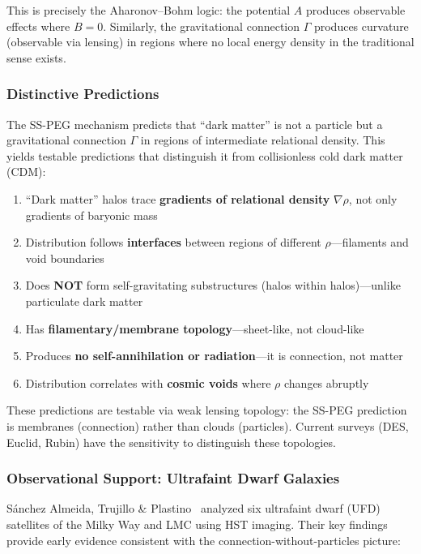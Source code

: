 This is precisely the Aharonov--Bohm logic: the potential $A$ produces observable effects where $B = 0$. Similarly, the gravitational connection $\Gamma$ produces curvature (observable via lensing) in regions where no local energy density in the traditional sense exists.

\subsubsection{Distinctive Predictions}

The SS-PEG mechanism predicts that ``dark matter'' is not a particle but a gravitational connection $\Gamma$ in regions of intermediate relational density. This yields testable predictions that distinguish it from collisionless cold dark matter (CDM):

\begin{enumerate}
\item ``Dark matter'' halos trace \textbf{gradients of relational density} $\nabla\rho$, not only gradients of baryonic mass
\item Distribution follows \textbf{interfaces} between regions of different $\rho$---filaments and void boundaries
\item Does \textbf{NOT} form self-gravitating substructures (halos within halos)---unlike particulate dark matter
\item Has \textbf{filamentary/membrane topology}---sheet-like, not cloud-like
\item Produces \textbf{no self-annihilation or radiation}---it is connection, not matter
\item Distribution correlates with \textbf{cosmic voids} where $\rho$ changes abruptly
\end{enumerate}

These predictions are testable via weak lensing topology: the SS-PEG prediction is membranes (connection) rather than clouds (particles). Current surveys (DES, Euclid, Rubin) have the sensitivity to distinguish these topologies.

\subsubsection{Observational Support: Ultrafaint Dwarf Galaxies}

S{\'a}nchez Almeida, Trujillo \& Plastino~\cite{SanchezAlmeitaTrujilloPlastino2024} analyzed six ultrafaint dwarf (UFD) satellites of the Milky Way and LMC using HST imaging. Their key findings provide early evidence consistent with the connection-without-particles picture:

